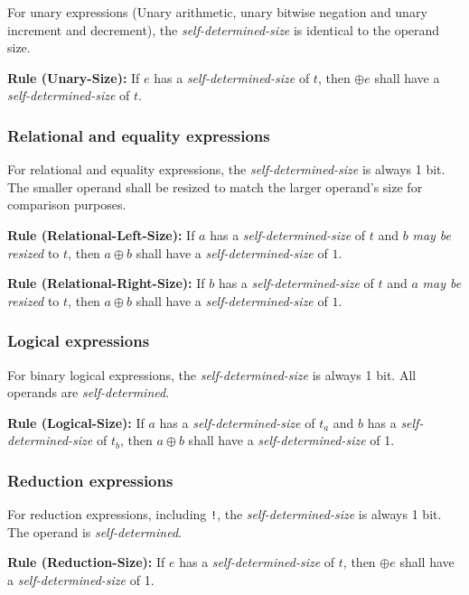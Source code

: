 \documentclass{article}
\newcommand{\sds}{\emph{self-determined-size}}
\newcommand{\mbr}{\emph{may be resized}}
\newenvironment{typingrule}[1]%
{\par\noindent\textbf{Rule (#1):} }%
{\par}
\begin{document}
For unary expressions (Unary arithmetic, unary bitwise negation and unary
increment and decrement), the \sds{} is identical to the
operand size.

\begin{typingrule}{Unary-Size}
  If $e$ has a \sds{} of $t$, then $\oplus e$ shall have
  a \sds{} of $t$.
\end{typingrule}

\subsubsection{Relational and equality expressions}%

For relational and equality expressions, the \sds{} is
always 1 bit. The smaller operand shall be resized to match the larger operand's
size for comparison purposes.

\begin{typingrule}{Relational-Left-Size}
  If $a$ has a \sds{} of $t$ and $b$ \mbr{}
  to $t$, then $a \oplus b$ shall have a \sds{} of $1$.
\end{typingrule}

\begin{typingrule}{Relational-Right-Size}
  If $b$ has a \sds{} of $t$ and $a$ \mbr{}
  to $t$, then $a \oplus b$ shall have a \sds{} of $1$.
\end{typingrule}

\subsubsection{Logical expressions}%

For binary logical expressions, the \sds{} is always 1 bit.
All operands are \emph{self-determined}.

\begin{typingrule}{Logical-Size}
  If $a$ has a \sds{} of $t_{a}$ and $b$ has a
  \sds{} of $t_{b}$, then $a \oplus b$ shall have a
  \sds{} of 1.
\end{typingrule}

\subsubsection{Reduction expressions}%

For reduction expressions, including \texttt{!}, the \sds{}
is always 1 bit. The operand is \emph{self-determined}.

\begin{typingrule}{Reduction-Size}
  If $e$ has a \sds{} of $t$, then $\oplus e$ shall have a
  \sds{} of 1.
\end{typingrule}
\end{document}
